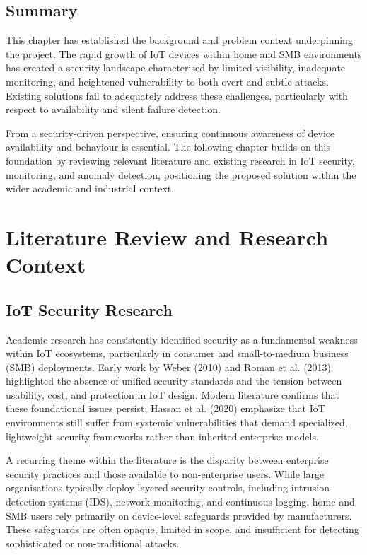 \section{Summary}

This chapter has established the background and problem context underpinning the project. The rapid growth of IoT devices within home and SMB environments has created a security landscape characterised by limited visibility, inadequate monitoring, and heightened vulnerability to both overt and subtle attacks. Existing solutions fail to adequately address these challenges, particularly with respect to availability and silent failure detection.

From a security-driven perspective, ensuring continuous awareness of device availability and behaviour is essential. The following chapter builds on this foundation by reviewing relevant literature and existing research in IoT security, monitoring, and anomaly detection, positioning the proposed solution within the wider academic and industrial context.

\chapter{Literature Review and Research Context}

\section{IoT Security Research}

Academic research has consistently identified security as a fundamental weakness within IoT ecosystems, particularly in consumer and small-to-medium business (SMB) deployments. Early work by Weber (2010) and Roman et al. (2013) highlighted the absence of unified security standards and the tension between usability, cost, and protection in IoT design. Modern literature confirms that these foundational issues persist; Hassan et al. (2020) emphasize that IoT environments still suffer from systemic vulnerabilities that demand specialized, lightweight security frameworks rather than inherited enterprise models.

A recurring theme within the literature is the disparity between enterprise security practices and those available to non-enterprise users. While large organisations typically deploy layered security controls, including intrusion detection systems (IDS), network monitoring, and continuous logging, home and SMB users rely primarily on device-level safeguards provided by manufacturers. These safeguards are often opaque, limited in scope, and insufficient for detecting sophisticated or non-traditional attacks.

